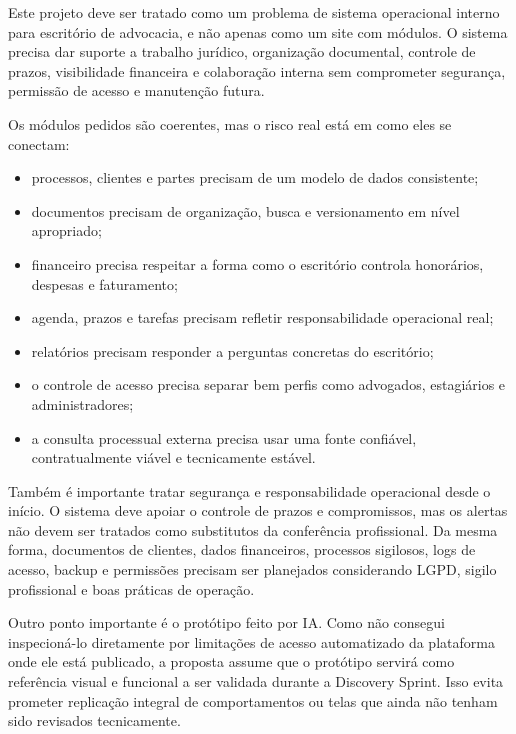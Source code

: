 \documentclass[11pt,a4paper]{article}
\begin{document}
Este projeto deve ser tratado como um problema de sistema operacional interno para escritório de advocacia, e não apenas como um site com módulos. O sistema precisa dar suporte a trabalho jurídico, organização documental, controle de prazos, visibilidade financeira e colaboração interna sem comprometer segurança, permissão de acesso e manutenção futura.\par

Os módulos pedidos são coerentes, mas o risco real está em como eles se conectam:

\begin{itemize}
\item processos, clientes e partes precisam de um modelo de dados consistente;
\item documentos precisam de organização, busca e versionamento em nível apropriado;
\item financeiro precisa respeitar a forma como o escritório controla honorários, despesas e faturamento;
\item agenda, prazos e tarefas precisam refletir responsabilidade operacional real;
\item relatórios precisam responder a perguntas concretas do escritório;
\item o controle de acesso precisa separar bem perfis como advogados, estagiários e administradores;
\item a consulta processual externa precisa usar uma fonte confiável, contratualmente viável e tecnicamente estável.
\end{itemize}

Também é importante tratar segurança e responsabilidade operacional desde o início. O sistema deve apoiar o controle de prazos e compromissos, mas os alertas não devem ser tratados como substitutos da conferência profissional. Da mesma forma, documentos de clientes, dados financeiros, processos sigilosos, logs de acesso, backup e permissões precisam ser planejados considerando LGPD, sigilo profissional e boas práticas de operação.\par

Outro ponto importante é o protótipo feito por IA. Como não consegui inspecioná-lo diretamente por limitações de acesso automatizado da plataforma onde ele está publicado, a proposta assume que o protótipo servirá como referência visual e funcional a ser validada durante a Discovery Sprint. Isso evita prometer replicação integral de comportamentos ou telas que ainda não tenham sido revisados tecnicamente.\par
\end{document}
